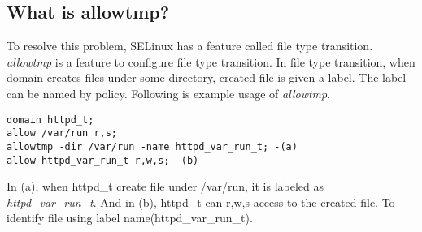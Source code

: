 \documentclass{article}
\begin{document}
\subsection{What is allowtmp?}
To resolve this problem, SELinux has a feature called file type
transition. {\it allowtmp } is a feature to configure file type
transition.
In file type transition, when domain creates files under some directory,
created file is given a label. The label can be named by policy.
Following is example  usage of {\it allowtmp}.
\begin{verbatim}
domain httpd_t;
allow /var/run r,s;
allowtmp -dir /var/run -name httpd_var_run_t; -(a)
allow httpd_var_run_t r,w,s; -(b)
\end{verbatim}
In (a), when httpd\_t create file under /var/run, it is labeled as {\it
httpd\_var\_run\_t}. And in (b), httpd\_t can r,w,s access to the
created file. To identify file using label name(httpd\_var\_run\_t).
\end{document}
